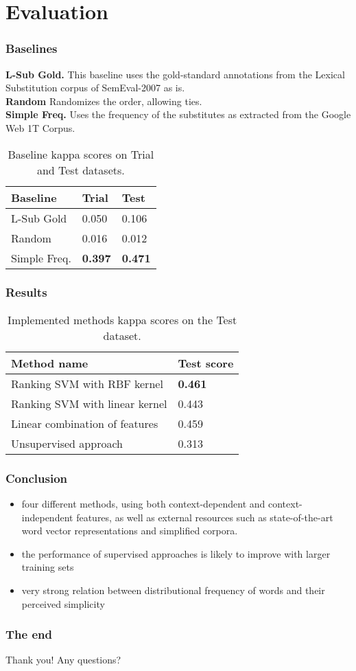 \documentclass[utf8]{beamer}
\begin{document}
\section{Evaluation}
\begin{frame}
 \frametitle{Baselines}
\textbf{L-Sub Gold.} This baseline uses the gold-standard annotations from the Lexical Substitution corpus of SemEval-2007 as is. \\
\textbf{Random} Randomizes the order, allowing ties. \\
\textbf{Simple Freq.} Uses the frequency of the substitutes as extracted from the Google Web 1T Corpus.

\begin{table}
\caption{Baseline kappa scores on Trial and Test datasets.}
\label{tab:baseline}
\begin{center}
\begin{tabular}{l|l|l}
Baseline & Trial & Test \\
\hline \hline
L-Sub Gold & 0.050 & 0.106 \\
Random & 0.016 & 0.012 \\
Simple Freq. & \textbf{0.397} & \textbf{0.471} \\
\end{tabular}
\end{center}
\end{table}

\end{frame}

\begin{frame}
 \frametitle{Results}

\begin{table}
\caption{Implemented methods kappa scores on the Test dataset.}
\label{tab:res}
\begin{center}
\begin{tabular}{l|l}
Method name & Test score \\
\hline \hline
Ranking SVM with RBF kernel & \textbf{0.461} \\
Ranking SVM with linear kernel & 0.443 \\
Linear combination of features & 0.459 \\
Unsupervised approach & 0.313 \\
\end{tabular}
\end{center}
\end{table}
\end{frame}

\begin{frame}
\frametitle{Conclusion}
\begin{itemize}
 \item four different methods, using both context-dependent and context-independent features, as well as external resources such as state-of-the-art word vector representations and simplified corpora.
  \item the performance of supervised approaches is likely to improve with larger training sets
  \item very strong relation between distributional frequency of words and their perceived simplicity
\end{itemize}
\end{frame}

\begin{frame}
 \frametitle{The end}
\begin{center}
 Thank you! Any questions?
\end{center}
\end{frame}
\end{document}
